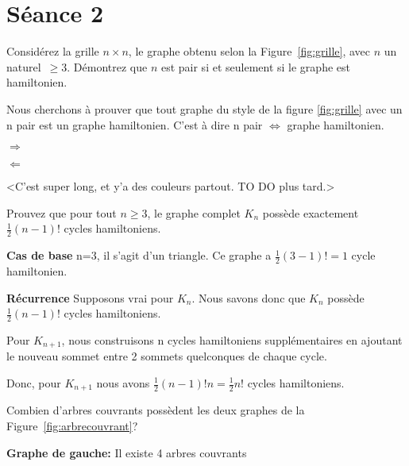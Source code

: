 
\section{Séance 2}

\begin{exo}
Consid\'erez la grille $n \times n$, le graphe obtenu selon la Figure~\ref{fig:grille}, avec $n$ un naturel~$\geq 3$.
D\'emontrez que $n$ est pair si et seulement si le graphe est hamiltonien.
\end{exo}



Nous cherchons à prouver que tout graphe du style de la figure \ref{fig:grille} avec un n pair est un graphe hamiltonien. C'est à dire n pair $\Leftrightarrow$ graphe hamiltonien.

$\Rightarrow$ 

$\Leftarrow$ 

<C'est super long, et y'a des couleurs partout. TO DO plus tard.>


\begin{exo}
Prouvez que pour tout $n \geq 3$, le graphe complet $K_n$ poss\`ede exactement $\frac{1}{2}(n-1)!$ cycles hamiltoniens.
\end{exo}

\textbf{Cas de base} n=3, il s'agit d'un triangle. Ce graphe a $\frac{1}{2}(3-1)! = 1$ cycle hamiltonien.

\textbf{Récurrence} Supposons vrai pour $K_n$. Nous savons donc que $K_n$ possède $\frac{1}{2}(n-1)!$ cycles hamiltoniens. 

Pour $K_{n+1}$, nous construisons n cycles hamiltoniens supplémentaires en ajoutant le nouveau sommet entre 2 sommets quelconques de chaque cycle.

Donc, pour $K_{n+1}$ nous avons $\frac{1}{2}(n-1)!n = \frac{1}{2}n!$ cycles hamiltoniens.



\begin{exo}
Combien d'arbres couvrants poss\`edent les deux graphes de la Figure~\ref{fig:arbrecouvrant}?
\end{exo}



\textbf{Graphe de gauche:} Il existe 4 arbres couvrants

\begin{figure}[!h]
\centering
\scalebox{.825}{}
\end{figure}

